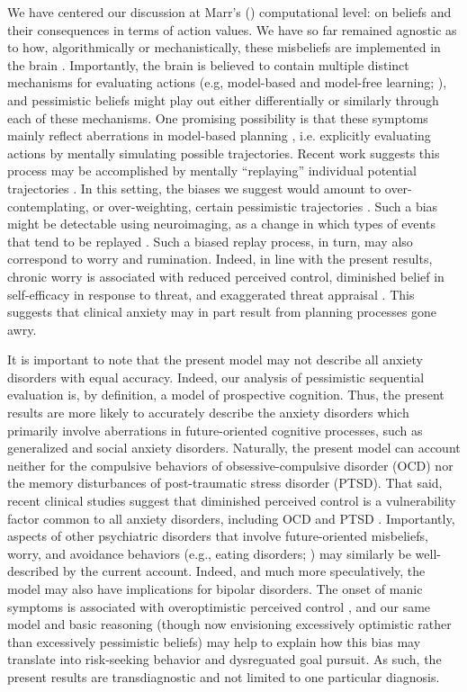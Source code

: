 \documentclass[manuscript]{stjour}
\begin{document}
We have centered our discussion at Marr's (\citeyear{marr1982}) computational level: on beliefs and their consequences in terms of action values. We have so far remained agnostic as to how, algorithmically or mechanistically, these misbeliefs are implemented in the brain \citep{friston2014computational}. Importantly, the brain is believed to contain multiple distinct mechanisms for evaluating actions (e.g, model-based and model-free learning; \citealp{daw2005, huys2015}), and pessimistic beliefs might play out either differentially or similarly through each of these mechanisms. One promising possibility is that these symptoms mainly reflect aberrations in model-based planning \citep{huys2015}, i.e. explicitly evaluating actions by mentally simulating possible trajectories. Recent work suggests this process may be accomplished by mentally ``replaying'' individual potential trajectories \citep{momennejad_offline_2018, mattar2018}. In this setting, the biases we suggest would amount to over-contemplating, or over-weighting, certain pessimistic trajectories \citep{hunter2019}. Such a bias might be detectable using neuroimaging, as a change in which types of events that tend to be replayed \citep{momennejad_offline_2018, ambrose2016}. Such a biased replay process, in turn, may also correspond to worry and rumination. Indeed, in line with the present results, chronic worry is associated with reduced perceived control, diminished belief in self-efficacy in response to threat, and exaggerated threat appraisal \citep{Berenbaum2010}. This suggests that clinical anxiety may in part result from planning processes gone awry. 

It is important to note that the present model may not describe all anxiety disorders with equal accuracy. Indeed, our analysis of pessimistic sequential evaluation is, by definition, a model of prospective cognition. Thus, the present results are more likely to accurately describe the anxiety disorders which primarily involve aberrations in future-oriented cognitive processes, such as generalized and social anxiety disorders. Naturally, the present model can account neither for the compulsive behaviors of obsessive-compulsive disorder (OCD) nor the memory disturbances of post-traumatic stress disorder (PTSD). That said, recent clinical studies suggest that diminished perceived control is a vulnerability factor common to all anxiety disorders, including OCD and PTSD \citep{gallagher2014a, gallagher2014b}. Importantly, aspects of other psychiatric disorders that involve future-oriented misbeliefs, worry, and avoidance behaviors (e.g., eating disorders; \citealp{konstantellou2011}) may similarly be well-described by the current account. Indeed, and much more speculatively, the model may also have implications for bipolar disorders. The onset of manic symptoms is associated with overoptimistic perceived control \citep{alloy2006}, and our same model and basic reasoning (though now envisioning excessively optimistic rather than excessively pessimistic beliefs) may help to explain how this bias may translate into risk-seeking behavior and dysreguated goal pursuit. As such, the present results are transdiagnostic and not limited to one particular diagnosis. 
\end{document}
